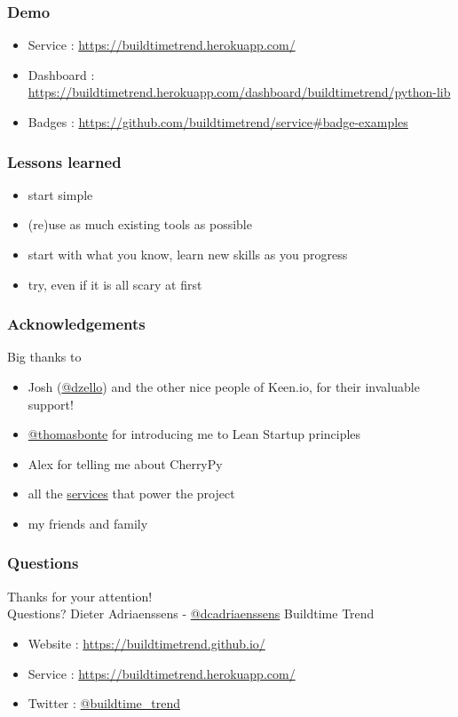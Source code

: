 \documentclass[14pt]{beamer}
\begin{document}
  \begin{frame}
    \frametitle{Demo}
    \begin{itemize}
      \item Service : \href{https://buildtimetrend.herokuapp.com/}{\small{https://buildtimetrend.herokuapp.com/}}
      \item Dashboard : \href{https://buildtimetrend.herokuapp.com/dashboard/buildtimetrend/python-lib/index.html}{\small{https://buildtimetrend.herokuapp.com/dashboard/buildtimetrend/python-lib}}
      \item Badges : \href{https://github.com/buildtimetrend/service\#badge-examples}{\small{https://github.com/buildtimetrend/service\#badge-examples}}
    \end{itemize}
  \end{frame}
  \begin{frame}
    \frametitle{Lessons learned}
    \begin{itemize}
      \item start simple
      \item (re)use as much existing tools as possible
      \item start with what you know, learn new skills as you progress
      \item try, even if it is all scary at first
    \end{itemize}
  \end{frame}
  \begin{frame}
    \frametitle{Acknowledgements}
    Big thanks to
    \begin{itemize}
      \item Josh (\href{https://twitter.com/dzello}{@dzello}) and the other nice people of Keen.io, for their invaluable support!
      \item \href{https://twitter.com/thomasbonte}{@thomasbonte} for introducing me to Lean Startup principles
      \item Alex for telling me about CherryPy
      \item all the \href{https://github.com/buildtimetrend/python-lib/wiki/Credits}{services} that power the project
      \item my friends and family
    \end{itemize}
  \end{frame}
  \begin{frame}
   \frametitle{Questions}
    Thanks for your attention!\\
    Questions?
    \vfill
    Dieter Adriaenssens - \href{https://twitter.com/dcadriaenssens}{\small{@dcadriaenssens}}
    \vfill
    Buildtime Trend
    \begin{itemize}
      \item Website : \href{https://buildtimetrend.github.io/}{\small{https://buildtimetrend.github.io/}}
      \item Service : \href{https://buildtimetrend.herokuapp.com/}{\small{https://buildtimetrend.herokuapp.com/}}
      \item Twitter : \href{https://twitter.com/buildtime_trend}{\small{@buildtime\_trend}}
    \end{itemize}
  \end{frame}
\end{document}
